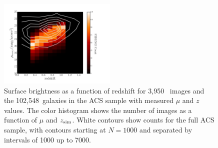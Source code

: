 \documentclass[twocolumn]{aastex6}
\begin{document}
\begin{figure}
\begin{center}
\includegraphics[width=0.5\textwidth]{figures/eye_of_sauron.pdf}
\caption{Surface brightness as a function of redshift for 3,950~\ferengi{}
images and the 102,548~galaxies in the ACS sample with measured $\mu$ and $z$
values. The color histogram shows the number of \ferengi{} images as a function
of $\mu$ and $z_{\rm sim}$. White contours show counts for the full ACS sample,
with contours starting at $N=1000$ and separated by intervals of 1000 up to
7000.} 
\label{fig:sb_redshift}
\end{center}
\end{figure}
\end{document}
